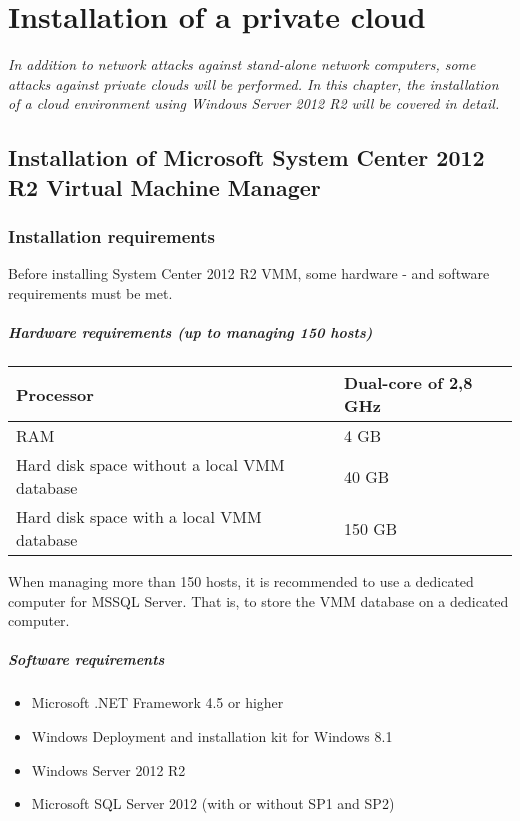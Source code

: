 \chapter{Installation of a private cloud}
\label{chap:cloud}
\emph{In addition to network attacks against stand-alone network computers, some attacks against private clouds will be performed. In this chapter, the installation of a cloud environment using Windows Server 2012 R2 will be covered in detail.}

\section{Installation of Microsoft System Center 2012 R2 Virtual Machine Manager}

\subsection{Installation requirements}

Before installing System Center 2012 R2 VMM, some hardware - and software requirements must be met.

\paragraph{Hardware requirements (up to managing 150 hosts)}
\begin{table}[h]
\begin{tabular}{|l|l|}
\hline
Processor                                                                   & Dual-core of 2,8 GHz \\ \hline
RAM                                                                         & 4 GB                 \\ \hline
Hard disk space without a local VMM database                                & 40 GB                \\ \hline
Hard disk space with a local VMM database  & 150 GB               \\ \hline
\end{tabular}
\end{table}
$\;$ \\
When managing more than 150 hosts, it is recommended to use a dedicated computer for MSSQL Server. That is, to store the VMM database on a dedicated computer.
\paragraph{Software requirements}
\begin{itemize}
\item Microsoft .NET Framework 4.5 or higher
\item Windows Deployment and installation kit for Windows 8.1
\item Windows Server 2012 R2
\item Microsoft SQL Server 2012 (with or without SP1 and SP2)
\end{itemize}
